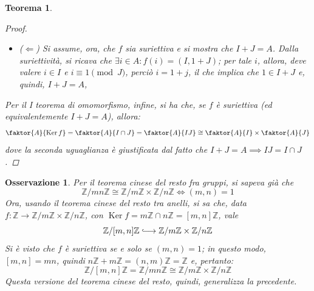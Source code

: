\documentclass[11pt]{scrartcl}
\theoremstyle{style1}
\newtheorem{osservazione}{Osservazione}[section]
\newtheorem{teorema}{Teorema}[section]
\numberwithin{equation}{subsection}
\newcommand{\longhookrightarrow}{\lhook\joinrel\longrightarrow}
\begin{document}
\begin{teorema}
\begin{proof}
\begin{itemize}
			Visto che $x \in A= I+J$, allora si pu\`o scrivere come $x = bi + aj$, per qualche $i \in I$ e $j\in J$, quindi:
			\[
				f(x) = (\underbracket{bi}_{\in I}  + aj + I, bi+ \underbracket{aj}_{\in J}  + j) = (aj+I,bi+J)
			\] 
			Notando, poi, che $1 = i + j\Leftarrow i= 1-j$ e $j=1-i$, si ha:
			\[
				(aj +I , bi+J) = (a(1-i) + I, b(1-j) + J) = (a+I,b_J)
			\] 
			pertanto $f$ \`e suriettiva.
		\item ($\Leftarrow $) Si assume, ora, che $f$ sia suriettiva e si mostra che $I+J = A$.
			Dalla suriettivit\`a, si ricava che $\exists i \in A : f(i) = (I,1+J)$; per tale $i$, allora, deve valere $i \in I$ e $i\equiv 1 \pmod{J} $, perci\`o $i = 1+j$, il che implica che $1 \in I+J$ e, quindi, $I+J=A$,
	\end{itemize}
	Per il I teorema di omomorfismo, infine, si ha che, se $f$ \`e suriettiva (ed equivalentemente $I+J = A$), allora:
	\[
		\faktor{A}{\operatorname{Ker} f}=\faktor{A}{I\cap J}=\faktor{A}{I J}\cong \faktor{A}{I} \times \faktor{A}{J}
	\] 
	dove la seconda uguaglianza \`e giustificata dal fatto che $I+J = A \implies IJ = I\cap J$.
	\end{proof}
\end{teorema}
\begin{osservazione}
Per il teorema cinese del resto fra gruppi, si sapeva gi\`a che 
\[
\mathbb{Z}/mn\mathbb{Z} \cong \mathbb{Z} / m\mathbb{Z}\times \mathbb{Z}/n\mathbb{Z} \iff (m,n) = 1
\] 
Ora, usando il teorema cinese del resto tra anelli, si sa che, data $f:\mathbb{Z}\longrightarrow \mathbb{Z}/ m \mathbb{Z} \times  \mathbb{Z}/ n \mathbb{Z}$, con $\operatorname{Ker} f = m\mathbb{Z} \cap n \mathbb{Z} = [m,n]\mathbb{Z}$, vale
\[
	\mathbb{Z}/[m,n]\mathbb{Z}\longhookrightarrow \mathbb{Z}/ m\mathbb{Z}\times \mathbb{Z}/n\mathbb{Z}
\] 
Si \`e visto che $f$ \`e suriettiva se e solo se $(m,n) = 1$; in questo modo, $[m,n] = mn$, quindi $n\mathbb{Z}+m\mathbb{Z}= (n,m)\mathbb{Z}=\mathbb{Z}$ e, pertanto:
\[
	\mathbb{Z}/ [m,n]\mathbb{Z}= \mathbb{Z}/ mn\mathbb{Z}\cong \mathbb{Z}/ m\mathbb{Z}\times \mathbb{Z}/n\mathbb{Z}
\] 
Questa versione del teorema cinese del resto, quindi, generalizza la precedente.
\end{osservazione}
\end{document}
